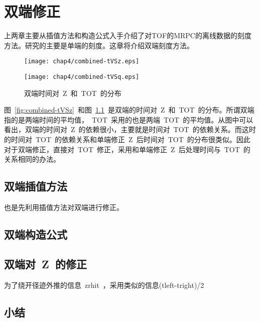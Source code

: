 \chapter{双端修正}
上两章主要从插值方法和构造公式入手介绍了对TOF的MRPC的离线数据的刻度方法。研究的主要是单端的刻度。这章将介绍双端刻度方法。

\begin{figure}[!h]
\begin{minipage}[!h]{0.5\linewidth}
\texttt{[image: chap4/combined-tVSz.eps]}
\label{fig:combined-tVSz}
\end{minipage}%
\hfill
\begin{minipage}[!h]{0.5\linewidth}
\texttt{[image: chap4/combined-tVSq.eps]}
\label{fig:combined-tVSq}
\end{minipage}
\caption{双端时间对~Z~和~TOT~的分布}
\end{figure}

图~\ref{fig:combined-tVSz}~和图~\ref{fig:combined-tVSq}~是双端的时间对~Z~和~TOT~的分布。所谓双端指的是两端时间的平均值，~TOT~采用的也是两端~TOT~的平均值。从图中可以看出，双端的时间对~Z~的依赖很小，主要就是时间对~TOT~的依赖关系。而这时的时间对~TOT~的依赖关系和单端修正~Z~后时间对~TOT~的分布很类似。因此对于双端修正，直接对~TOT~修正，采用和单端修正~Z~后处理时间与~TOT~的关系相同的办法。

\section{双端插值方法}
也是先利用插值方法对双端进行修正。
\section{双端构造公式}
\section{双端对~Z~的修正}
为了绕开径迹外推的信息~zrhit~，采用类似的信息(tleft-tright)/2
\section{小结}












